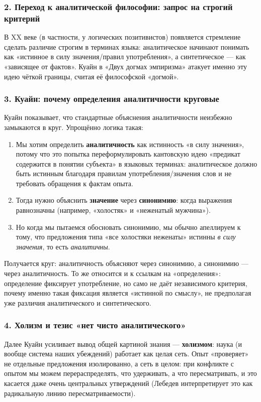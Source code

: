 \documentclass[a4paper,12pt]{article}
\begin{document}
\subsubsection*{2. Переход к аналитической философии: запрос на строгий критерий}

В XX веке (в частности, у логических позитивистов) появляется стремление сделать различие строгим в терминах языка: аналитическое начинают понимать как «истинное в силу значения/правил употребления», а синтетическое — как «зависящее от фактов». Куайн в «Двух догмах эмпиризма» атакует именно эту идею чёткой границы, считая её философской «догмой».

\subsubsection*{3. Куайн: почему определения аналитичности круговые}

Куайн показывает, что стандартные объяснения аналитичности неизбежно замыкаются в круг. Упрощённо логика такая:
\begin{enumerate}
    \item Мы хотим определить \textbf{аналитичность} как истинность «в силу значения», потому что это попытка переформулировать кантовскую идею «предикат содержится в понятии субъекта» в языковых терминах: аналитическое должно быть истинным благодаря правилам употребления/значения слов и не требовать обращения к фактам опыта.
    \item Тогда нужно объяснить \textbf{значение} через \textbf{синонимию}: когда выражения равнозначны (например, «холостяк» и «неженатый мужчина»).
    \item Но когда мы пытаемся обосновать синонимию, мы обычно апеллируем к тому, что предложения типа «все холостяки неженаты» истинны \emph{в силу значения}, то есть \emph{аналитичны}.
\end{enumerate}
Получается круг: аналитичность объясняют через синонимию, а синонимию — через аналитичность. То же относится и к ссылкам на «определения»: определение фиксирует употребление, но само не даёт независимого критерия, почему именно такая фиксация является «истинной по смыслу», не предполагая уже различия аналитического и синтетического.

\subsubsection*{4. Холизм и тезис «нет чисто аналитического»}

Далее Куайн усиливает вывод общей картиной знания — \textbf{холизмом}: наука (и вообще система наших убеждений) работает как целая сеть. Опыт «проверяет» не отдельные предложения изолированно, а сеть в целом: при конфликте с опытом мы можем перераспределять, что удерживать, а что пересматривать, и это касается даже очень центральных утверждений (Лебедев интерпретирует это как радикальную линию пересматриваемости).
\end{document}
